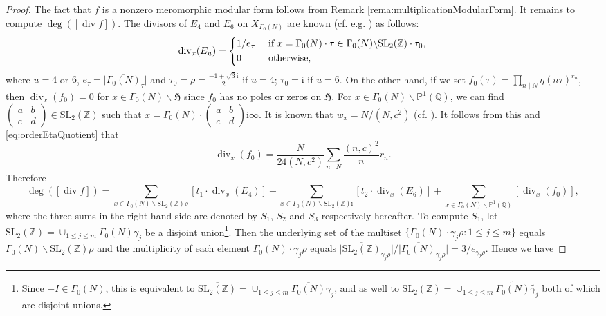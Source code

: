 \documentclass[12pt]{amsart}
\numberwithin{equation}{section}
\theoremstyle{plain}
\theoremstyle{definition}
\theoremstyle{remark}
\newcommand\rmi{\mathrm{i}}
\newcommand\tbtmat[4]{\left(\begin{smallmatrix}{#1} & {#2} \\ {#3} & {#4}\end{smallmatrix}\right)}
\newcommand*\abs[1]{\lvert#1\rvert}
\renewcommand\div{\mathop{\mathrm{div}}}
\newcommand\projQ{\mathbb{P}^1(\mathbb{Q})}
\newcommand\slZ{\mathrm{SL}_2(\mathbb{Z})}
\newcommand\uhp{\mathfrak{H}}
\begin{document}
\begin{proof}
The fact that $f$ is a nonzero meromorphic modular form follows from Remark \ref{rema:multiplicationModularForm}. It remains to compute $\deg\left([\div f]\right)$. The divisors of $E_4$ and $E_6$ on $X_{\Gamma_0(N)}$ are known (cf. e.g. \cite[Proposition 5.6.5]{CS17}) as follows:
\begin{equation*}
\div\nolimits_x(E_u)=\begin{dcases}
1/e_\tau & \text{ if } x=\Gamma_0(N)\cdot\tau\in\Gamma_0(N)\backslash\slZ\cdot\tau_0,\\
0 & \text{ otherwise},
\end{dcases}
\end{equation*}
where $u=4$ or $6$, $e_\tau=\abs{\overline{\Gamma_0(N)}_\tau}$ and $\tau_0=\rho=\frac{-1+\sqrt{3}\rmi}{2}$ if $u=4$; $\tau_0=\rmi$ if $u=6$. On the other hand, if we set $f_0(\tau)=\prod_{n \mid N}\eta(n\tau)^{r_n}$, then $\div_x(f_0)=0$ for $x\in\Gamma_0(N)\backslash\uhp$ since $f_0$ has no poles or zeros on $\uhp$. For $x\in\Gamma_0(N)\backslash\projQ$, we can find $\tbtmat{a}{b}{c}{d}\in\slZ$ such that $x=\Gamma_0(N)\cdot\tbtmat{a}{b}{c}{d}\rmi\infty$. It is known that $w_x=N/(N,c^2)$ (cf. \cite[Corollary 6.3.24(a)]{CS17}). It follows from this and \eqref{eq:orderEtaQuotient} that
\begin{equation}
\label{eq:divEtaQuotient}
\div\nolimits_x(f_0)=\frac{N}{24(N,c^2)}\sum_{n \mid N}\frac{(n,c)^2}{n}r_n.
\end{equation}
Therefore
\begin{equation}
\label{eq:threeSumsDegDiv}
\deg\left([\div f]\right)=\sum_{x\in\Gamma_0(N)\backslash\slZ\rho}[t_1\cdot\div\nolimits_x(E_4)]+\sum_{x\in\Gamma_0(N)\backslash\slZ\rmi}[t_2\cdot\div\nolimits_x(E_6)]+\sum_{x\in\Gamma_0(N)\backslash\projQ}[\div\nolimits_x(f_0)],
\end{equation}
where the three sums in the right-hand side are denoted by $S_1$, $S_2$ and $S_3$ respectively hereafter.
To compute $S_1$, let $\slZ=\cup_{1 \leq j \leq m}\Gamma_0(N)\gamma_j$ be a disjoint union\footnote{Since $-I\in\Gamma_0(N)$, this is equivalent to $\overline{\slZ}=\cup_{1 \leq j \leq m}\overline{\Gamma_0(N)}\overline{\gamma_j}$, and as well to $\widetilde{\slZ}=\cup_{1 \leq j \leq m}\widetilde{\Gamma_0(N)}\widetilde{\gamma_j}$ both of which are disjoint unions.}. Then the underlying set of the multiset $\{\Gamma_0(N)\cdot\gamma_j\rho\colon 1 \leq j \leq m\}$ equals $\Gamma_0(N)\backslash\slZ\rho$ and the multiplicity of each element $\Gamma_0(N)\cdot\gamma_j\rho$ equals $\abs{\overline{\slZ}_{\gamma_j\rho}}/\abs{\overline{\Gamma_0(N)}_{\gamma_j\rho}}=3/e_{\gamma_j\rho}$. Hence we have

\end{proof}
\end{document}
